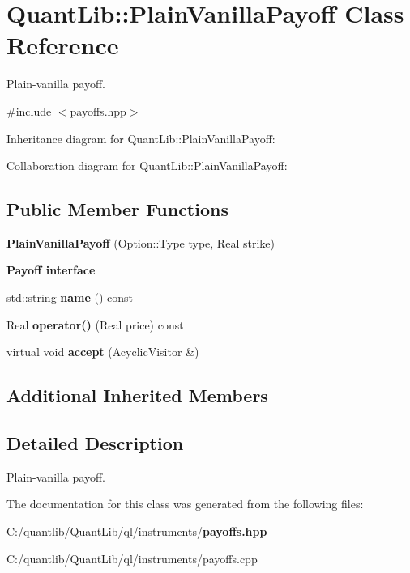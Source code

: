 \section{Quant\+Lib\+:\+:Plain\+Vanilla\+Payoff Class Reference}
\label{class_quant_lib_1_1_plain_vanilla_payoff}


Plain-\/vanilla payoff.  




{\ttfamily \#include $<$payoffs.\+hpp$>$}



Inheritance diagram for Quant\+Lib\+:\+:Plain\+Vanilla\+Payoff\+:


Collaboration diagram for Quant\+Lib\+:\+:Plain\+Vanilla\+Payoff\+:
\subsection*{Public Member Functions}
\begin{DoxyCompactItemize}
\item 
{\bfseries Plain\+Vanilla\+Payoff} (Option\+::\+Type type, Real strike)\label{class_quant_lib_1_1_plain_vanilla_payoff_a800a6dd8c0b0cc0c6ddc20cadcba5028}

\end{DoxyCompactItemize}
\begin{Indent}{\bf Payoff interface}\par
\begin{DoxyCompactItemize}
\item 
std\+::string {\bfseries name} () const \label{class_quant_lib_1_1_plain_vanilla_payoff_a697c961308ed400406f312f255b9879f}

\item 
Real {\bfseries operator()} (Real price) const \label{class_quant_lib_1_1_plain_vanilla_payoff_a27e9dc8834d89d445dbf4a001c49607b}

\item 
virtual void {\bfseries accept} (Acyclic\+Visitor \&)\label{class_quant_lib_1_1_plain_vanilla_payoff_ad9ea7b0dc12e3ae2f3ae0681d594fa27}

\end{DoxyCompactItemize}
\end{Indent}
\subsection*{Additional Inherited Members}


\subsection{Detailed Description}
Plain-\/vanilla payoff. 

The documentation for this class was generated from the following files\+:\begin{DoxyCompactItemize}
\item 
C\+:/quantlib/\+Quant\+Lib/ql/instruments/{\bf payoffs.\+hpp}\item 
C\+:/quantlib/\+Quant\+Lib/ql/instruments/payoffs.\+cpp\end{DoxyCompactItemize}
